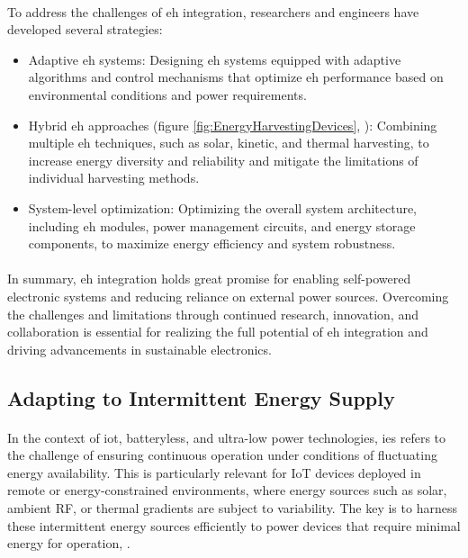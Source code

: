         \paragraph{}
        To address the challenges of \gls{eh} integration, researchers and engineers have developed several strategies:
        \begin{itemize}
            \item Adaptive \gls{eh} systems: Designing \gls{eh} systems equipped with adaptive algorithms and control mechanisms that optimize \gls{eh} performance based on environmental conditions and power requirements.
            \item Hybrid \gls{eh} approaches (figure \ref{fig:EnergyHarvestingDevices}, \cite{jlpea13040062}): Combining multiple \gls{eh} techniques, such as solar, kinetic, and thermal harvesting, to increase energy diversity and reliability and mitigate the limitations of individual harvesting methods.
            \item System-level optimization: Optimizing the overall system architecture, including \gls{eh} modules, power management circuits, and energy storage components, to maximize energy efficiency and system robustness.
        \end{itemize}

        \paragraph{}
        In summary, \gls{eh} integration holds great promise for enabling self-powered electronic systems and reducing reliance on external power sources. Overcoming the challenges and limitations through continued research, innovation, and collaboration is essential for realizing the full potential of \gls{eh} integration and driving advancements in sustainable electronics.
        


    \subsection{Adapting to Intermittent Energy Supply}

    \paragraph{}
    In the context of \gls{iot}, batteryless, and ultra-low power technologies, \gls{ies} refers to the challenge of ensuring continuous operation under conditions of fluctuating energy availability. This is particularly relevant for IoT devices deployed in remote or energy-constrained environments, where energy sources such as solar, ambient RF, or thermal gradients are subject to variability. The key is to harness these intermittent energy sources efficiently to power devices that require minimal energy for operation\cite{gameboyBatteryless}, \cite{basedArticle}.

